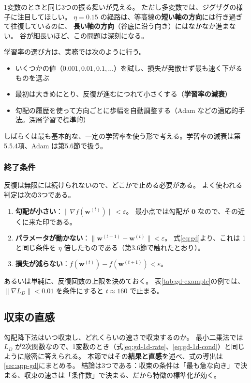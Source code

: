 1変数のときと同じ3つの振る舞いが見える。
ただし多変数では、ジグザグの様子に注目してほしい。
$\eta = 0.15$ の経路は、等高線の\textbf{短い軸の方向}には行き過ぎて往復しているのに、
\textbf{長い軸の方向}（谷底に沿う向き）にはなかなか進まない。
谷が細長いほど、この問題は深刻になる。

学習率の選び方は、実務では次のように行う。
\begin{itemize}
  \item いくつかの値（$0.001, 0.01, 0.1, \ldots$）を試し、損失が発散せず最も速く下がるものを選ぶ
  \item 最初は大きめにとり、反復が進むにつれて小さくする（\textbf{学習率の減衰}）
  \item 勾配の履歴を使って方向ごとに歩幅を自動調整する（Adam などの適応的手法。深層学習で標準的）
\end{itemize}
しばらくは最も基本的な、一定の学習率を使う形で考える。学習率の減衰は第5.5.4項、Adam は第5.6節で扱う。

\subsubsection{終了条件}

反復は無限には続けられないので、どこかで止める必要がある。
よく使われる判定は次の3つである。
\begin{enumerate}
  \item \textbf{勾配が小さい}：$\|\nabla f(\bm{w}^{(t)})\| < \varepsilon$。
    最小点では勾配が $\bm{0}$ なので、その近くに来た印である。
  \item \textbf{パラメータが動かない}：$\|\bm{w}^{(t+1)} - \bm{w}^{(t)}\| < \varepsilon$。
    式\eqref{eq:gd}より、これは 1 と同じ条件を $\eta$ 倍したものである（第3.6節で触れたとおり）。
  \item \textbf{損失が減らない}：$f(\bm{w}^{(t)}) - f(\bm{w}^{(t+1)}) < \varepsilon$。
\end{enumerate}
あるいは単純に、反復回数の上限を決めておく。
表\ref{tab:gd-example}の例では、$\|\nabla L_D\| < 0.01$ を条件にすると $t \approx 160$ で止まる。


\subsection{収束の直感}

勾配降下法はいつ収束し、どれくらいの速さで収束するのか。
最小二乗法では $L_D$ が2次関数なので、1変数のとき（式\eqref{eq:gd-1d-rate}、\eqref{eq:gd-1d-cond}）と同じように厳密に答えられる。
本節ではその\textbf{結果と直感}を述べ、式の導出は\ref{sec:app-gd}にまとめる。
結論は3つである：収束の条件は「最も急な向き」で決まる、収束の速さは「条件数」で決まる、だから特徴の標準化が効く。

